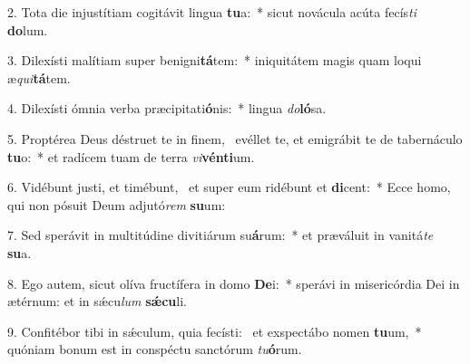 2. Tota die injustítiam cogitávit lingua \textbf{tu}a:~*  sicut novácula acúta fecís\textit{ti} \textbf{do}lum.\

3. Dilexísti malítiam super benigni\textbf{tá}tem:~*  iniquitátem magis quam loqui æ\textit{qui}\textbf{tá}tem.\

4. Dilexísti ómnia verba præcipitati\textbf{ó}nis:~*  lingua \textit{do}\textbf{ló}sa.\

5. Proptérea Deus déstruet te in finem, \dag\  evéllet te, et emigrábit te de tabernáculo \textbf{tu}o:~*  et radícem tuam de terra \textit{vi}\textbf{vén}\textbf{ti}um.\

6. Vidébunt justi, et timébunt, \dag\  et super eum ridébunt et \textbf{di}cent:~*  Ecce homo, qui non pósuit Deum adjutó\textit{rem} \textbf{su}um:\

7. Sed sperávit in multitúdine divitiárum su\textbf{á}rum:~*  et præváluit in vanitá\textit{te} \textbf{su}a.\

8. Ego autem, sicut olíva fructífera in domo \textbf{De}i:~*  sperávi in misericórdia Dei in ætérnum: et in sǽcu\textit{lum} \textbf{sǽ}\textbf{cu}li.\

9. Confitébor tibi in sǽculum, quia fecísti: \dag\  et exspectábo nomen \textbf{tu}um,~*  quóniam bonum est in conspéctu sanctórum \textit{tu}\textbf{ó}rum.\

